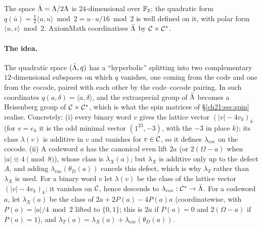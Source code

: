 The space $\bar{\Lambda}={\Lambda}/2{\Lambda}$ is $24$-dimensional over $\mathbb{F}_2$; the quadratic form
$q(\bar u)=\tfrac12\langle u,u\rangle\bmod2=u\cdot u/16\bmod 2$ is well defined on it, with polar
form $\langle u,v\rangle\bmod2$.  AxiomMath coordinatises $\bar{\Lambda}$ by $\mathcal{C}\times\mathcal{C}^*$.

\paragraph{The idea.}  The quadratic space $(\bar{\Lambda},q)$ has a ``hyperbolic'' splitting into two
complementary $12$-dimensional subspaces on which $q$ vanishes, one coming from the code and one from
the cocode, paired with each other by the code--cocode pairing.  In such coordinates
$q(a,\delta)=\langle a,\delta\rangle$, and the extraspecial group of $\bar{\Lambda}$ becomes a Heisenberg
group of $\mathcal{C}\times\mathcal{C}^*$, which is what the spin matrices of \S\ref{ch21:sec:spin} realise.
Concretely: (i) every binary word $v$ gives the lattice vector $(|v|-4v_k)_k$ (for $v=e_k$ it is the odd
minimal vector $(1^{23},-3)$, with the $-3$ in place $k$); its class $\lambda(v)$ is additive in $v$ and
vanishes for $v\in\mathcal{C}$, so it defines $\lambda_{\mathrm{coc}}$ on the cocode.  (ii) A codeword $a$ has
the canonical even lift $2a$ (or $2(\Omega-a)$ when $|a|\equiv4\pmod8$), whose class is $\lambda_X(a)$;
but $\lambda_X$ is additive only up to the defect $A$, and adding $\lambda_{\mathrm{coc}}(\theta_D(a))$
cancels this defect, which is why $\lambda_T$ rather than $\lambda_X$ is used.
For a binary word $v$ let $\lambda(v)$ be the class of the lattice vector $(|v|-4v_k)_k$; it vanishes
on $\mathcal{C}$, hence descends to $\lambda_{\mathrm{coc}}:\mathcal{C}^*\to\bar{\Lambda}$.  For a codeword $a$, let
$\lambda_X(a)$ be the class of $2a+2P(a)-4P(a)a$ (coordinatewise, with $P(a)=|a|/4\bmod 2$ lifted to
$\{0,1\}$; this is $2a$ if $P(a)=0$ and $2(\Omega-a)$ if $P(a)=1$), and $\lambda_T(a)=\lambda_X(a)+\lambda_{\mathrm{coc}}(\theta_D(a))$.


